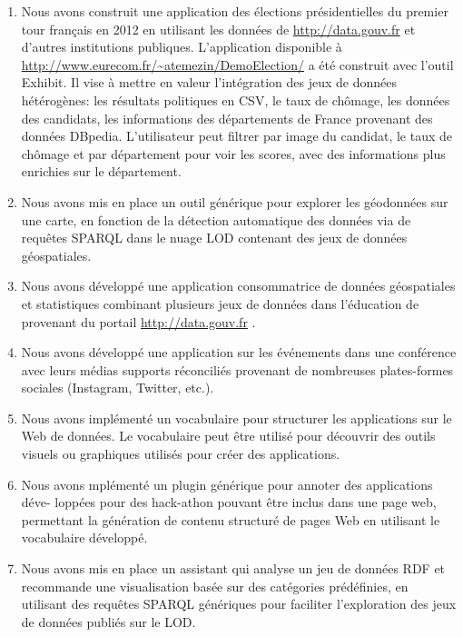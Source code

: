 \documentclass[a4paper,11pt,twoside]{report}
\begin{document}
\begin{enumerate}

\item 
Nous avons construit une application des élections présidentielles du premier tour français en 2012 en utilisant les données de \url{http://data.gouv.fr} et d'autres institutions publiques. L'application disponible à \url{http://www.eurecom.fr/~atemezin/DemoElection/} a été construit avec l'outil Exhibit. Il vise à mettre en valeur l'intégration des jeux de données hétérogènes: les résultats politiques en CSV, le taux de chômage, les données des candidats, les informations des départements de France provenant des données DBpedia. L'utilisateur peut filtrer par image du candidat, le taux de chômage et par département pour voir les scores, avec des informations plus enrichies sur le département.
 
\item 
Nous avons mis en place un outil générique pour explorer les géodonnées sur une carte, en fonction de la détection automatique des données via de requêtes SPARQL dans le nuage LOD contenant des jeux de données géospatiales.


\item 
Nous avons développé une application consommatrice de données géospatiales et statistiques combinant plusieurs jeux de données dans l'éducation de provenant du portail \url{http://data.gouv.fr} .

\item 
Nous avons développé une application sur les événements dans une conférence avec leurs médias supports réconciliés provenant de nombreuses plates-formes sociales (Instagram, Twitter, etc.).

\item 
Nous avons implémenté un vocabulaire pour structurer les applications sur le Web de données. Le vocabulaire peut être utilisé pour découvrir des outils visuels ou graphiques utilisés pour créer des applications.

\item 
Nous avons mplémenté un plugin générique pour annoter des applications déve- loppées pour des hack-athon pouvant être inclus dans une page web, permettant la génération de contenu structuré de pages Web en utilisant le vocabulaire développé.

\item 
Nous avons mis en place un assistant qui analyse un jeu de données RDF et  recommande une visualisation basée sur des catégories prédéfinies, en utilisant des requêtes SPARQL génériques pour faciliter l'exploration des jeux de données publiés sur le LOD.


\end{enumerate}
\end{document}
